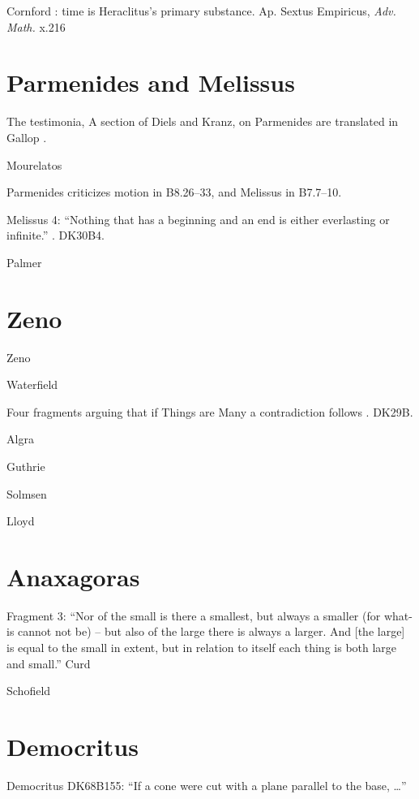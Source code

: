 \documentclass{amsart}
\theoremstyle{definition}
\begin{document}
Cornford \cite[p.~184]{religion}: time is Heraclitus's primary substance. Ap. Sextus Empiricus, {\em Adv. Math.} x.216



\section{Parmenides and Melissus}
The testimonia, A section of Diels and Kranz, on Parmenides are translated in Gallop \cite{gallop}.

Mourelatos \cite[pp.~118--119]{mourelatos}

Parmenides criticizes motion in B8.26--33, and Melissus in B7.7--10.

Melissus 4: ``Nothing that has a beginning and an end is either everlasting or infinite.'' \cite[p.~48]{ancilla}. DK30B4.

Palmer \cite{palmer}


\section{Zeno}
Zeno \cite[pp.~45, 67, 71--85]{lee}

Waterfield \cite{waterfield2009}

Four fragments arguing that if Things are Many a contradiction follows \cite[p.~47]{ancilla}. DK29B.

Algra \cite{algra}

Guthrie \cite{HGPII}

Solmsen \cite[p.~18]{experiments}

Lloyd \cite{lloyd1979}



\section{Anaxagoras}
Fragment 3: ``Nor of the small is there a smallest, but always a smaller (for what-is cannot not be) -- but also
of the large there is always a larger. And [the large] is equal to the small in extent, but in relation to itself each thing is both large and
small.'' Curd \cite[pp.~38--42]{curd2007}

Schofield \cite[Chapter 3]{schofield}



\section{Democritus}
Democritus DK68B155: ``If a cone were cut with a plane parallel to the base, \ldots'' \cite[p.~106]{ancilla}
\end{document}
